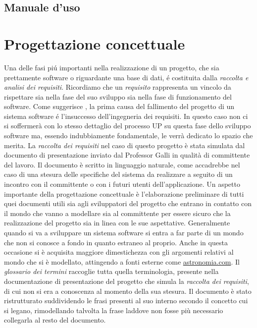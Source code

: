 \documentclass[12pt,a4paper,onecolumn,x11names]{article}
\begin{document}
\subsection{Manuale d'uso}
\clearpage

\section{Progettazione concettuale}

	\begin{flushleft}
		Una delle fasi pi\'{u} importanti nella realizzazione di un progetto, che sia prettamente software o riguardante una base di dati, \'{e} costituita dalla \textit{raccolta e analisi dei requisiti}. Ricordiamo che un \textit{requisito} rappresenta un vincolo da rispettare sia nella fase del suo sviluppo sia nella fase di funzionamento del software. Come suggerisce \cite{Arlow}, la prima causa del fallimento del progetto di un sistema software \'{e} l'insuccesso dell'ingegneria dei requisiti. In questo caso non ci si soffermerà con lo stesso dettaglio del processo UP su questa fase dello sviluppo software ma, essendo indubbiamente fondamentale, le verrà dedicato lo spazio che merita.
		\newline\newline
		La \textit{raccolta dei requisiti} nel caso di questo progetto è stata simulata dal documento di presentazione inviato dal Professor Galli in qualità di committente del lavoro. Il documento è scritto in linguaggio naturale, come accadrebbe nel caso di una stesura delle  specifiche del sistema da realizzare a seguito di un incontro con il committente o con i futuri utenti dell'applicazione.
		Un aspetto importante della progettazione concettuale è l'elaborazione preliminare di tutti quei documenti utili sia agli sviluppatori del progetto che entrano in contatto con il mondo che vanno a modellare sia al committente per essere sicuro che la realizzazione del progetto sia in linea con le sue aspettative. 
		\newline\newline
		Generalmente quando si va a sviluppare un sistema software si entra a far parte di un mondo che non si conosce a fondo in quanto estraneo al proprio. Anche in questa occasione si è acquisita maggiore dimestichezza con gli argomenti relativi al mondo che si è modellato, attingendo a fonti esterne come \textsf{\href{http://www.astronomia.com}{astronomia.com}}. Il \textit{glossario dei termini} raccoglie tutta quella terminologia, presente nella documentazione di presentazione del progetto che simula la \textit{raccolta dei requisiti}, di cui non si era a conoscenza al momento della sua stesura.\newline\newline		
		Il documento è stato ristrutturato suddividendo le frasi presenti al suo interno secondo il concetto cui si legano, rimodellando talvolta la frase laddove non fosse più necessario collegarla al resto del documento.
	\end{flushleft}
	
\end{document}
